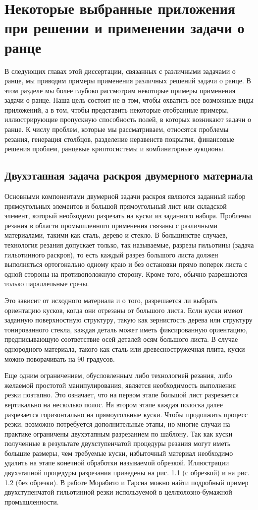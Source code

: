 \chapter{Некоторые выбранные приложения при решении и применении задачи о ранце} \label{chapt1}
В следующих главах этой диссертации, связанных с различными задачами о ранце, мы приводим примеры применения различных решений задачи о ранце. В этом разделе мы более глубоко рассмотрим некоторые примеры применения задачи о ранце. Наша цель состоит не в том, чтобы охватить все возможные виды приложений, а в том, чтобы представить некоторые отобранные примеры, иллюстрирующие пропускную способность полей, в которых возникают задачи о ранце. К числу проблем, которые мы рассматриваем, относятся проблемы резания, генерация столбцов, разделение неравенств покрытия, финансовые решения проблем, ранцевые криптосистемы и комбинаторные аукционы.
\section{Двухэтапная задача раскроя двумерного материала} \label{sect1_1}
Основными компонентами двумерной задачи раскроя являются заданный набор прямоугольных элементов и большой прямоугольный лист или складской элемент, который необходимо разрезать на куски из заданного набора. Проблемы резания в области промышленного применения связаны с различными материалами, такими как сталь, дерево и стекло. В большинстве случаев, технология резания допускает только, так называемые, разрезы гильотины (задача гильотинного раскроя), то есть каждый разрез большого листа должен выполняться ортогонально одному краю и без остановки прямо поперек листа с одной стороны на противоположную сторону. Кроме того, обычно разрешаются только параллельные срезы.

Это зависит от исходного материала и о того, разрешается ли выбрать ориентацию кусков, когда они отрезаны от большого листа. Если куски имеют заданную поверхностную структуру, такую как зернистость дерева или структуру тонированного стекла, каждая деталь может иметь фиксированную ориентацию, предписывающую соответствие осей деталей осям большого листа. В случае однородного материала, такого как сталь или древесностружечная плита, куски можно поворачивать на 90 градусов.

Еще одним ограничением, обусловленным либо технологией резания, либо желаемой простотой манипулирования, является необходимость выполнения резки поэтапно. Это означает, что на первом этапе большой лист разрезается вертикально на несколько полос. На втором этапе каждая полоска далее разрезается горизонтально на прямоугольные куски. Чтобы продолжить процесс резки, возможно потребуется дополнительные этапы, но многие случаи на практике ограничены двухэтапным разрезанием по шаблону. Так как куски полученные в результате двухступенчатой процедуры резания могут иметь большие размеры, чем требуемые куски, избыточный материал необходимо удалить на этапе конечной обработки называемой обрезкой. Иллюстрации двухэтапной процедуры разрезания приведены на рис. 1.1 (с обрезкой) и на рис. 1.2 (без обрезки). В работе Морабито и Гарсиа \cite{Morabito} можно найти подробный пример двухступенчатой гильотинной резки используемой в целлюлозно-бумажной промышленности.

